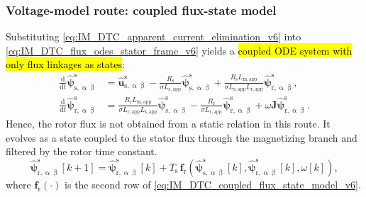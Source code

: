 \begin{frame}
    \frametitle{Voltage-model route: coupled flux-state model}
    Substituting \eqref{eq:IM_DTC_apparent_current_elimination_v6} into \eqref{eq:IM_DTC_flux_odes_stator_frame_v6} yields a \hl{coupled ODE system with only flux linkages as states}:
    \begin{equation}
        \begin{aligned}
            \frac{\mathrm{d}}{\mathrm{d}t}\hat{\bm{\psi}}^{\mathrm{s}}_{\mathrm{s},\upalpha\upbeta}
             & =\hat{\bm{u}}^{\mathrm{s}}_{\mathrm{s},\upalpha\upbeta}
            -\frac{R_\mathrm{s}}{\sigma L_{\mathrm{s,app}}}
            \hat{\bm{\psi}}^{\mathrm{s}}_{\mathrm{s},\upalpha\upbeta}
            +\frac{R_\mathrm{s}L_{\mathrm{m,app}}}{\sigma L_{\mathrm{s,app}}L_{\mathrm{r,app}}}
            \hat{\bm{\psi}}^{\mathrm{s}}_{\mathrm{r},\upalpha\upbeta},                             \\[0.6ex]
            \frac{\mathrm{d}}{\mathrm{d}t}\hat{\bm{\psi}}^{\mathrm{s}}_{\mathrm{r},\upalpha\upbeta}
             & =\frac{R_\mathrm{r}L_{\mathrm{m,app}}}{\sigma L_{\mathrm{r,app}}L_{\mathrm{s,app}}}
            \hat{\bm{\psi}}^{\mathrm{s}}_{\mathrm{s},\upalpha\upbeta}
            -\frac{R_\mathrm{r}}{\sigma L_{\mathrm{r,app}}}
            \hat{\bm{\psi}}^{\mathrm{s}}_{\mathrm{r},\upalpha\upbeta}
            +\omega\bm{J}\hat{\bm{\psi}}^{\mathrm{s}}_{\mathrm{r},\upalpha\upbeta}.
        \end{aligned}
        \label{eq:IM_DTC_coupled_flux_state_model_v6}
    \end{equation}\pause%
    Hence, the rotor flux is not obtained from a static relation in this route. It evolves as a state coupled to the stator flux through the magnetizing branch and filtered by the rotor time constant.\pause%
    \begin{equation}
        \hat{\bm{\psi}}^{\mathrm{s}}_{\mathrm{r},\upalpha\upbeta}[k+1]
        =\hat{\bm{\psi}}^{\mathrm{s}}_{\mathrm{r},\upalpha\upbeta}[k]
        +T_\mathrm{s}\,\bm{f}_\mathrm{r}\!\left(
        \hat{\bm{\psi}}^{\mathrm{s}}_{\mathrm{s},\upalpha\upbeta}[k],
        \hat{\bm{\psi}}^{\mathrm{s}}_{\mathrm{r},\upalpha\upbeta}[k],\omega[k]\right),
        \label{eq:IM_DTC_rotor_flux_euler_v6}
    \end{equation}
    where $\bm{f}_\mathrm{r}(\cdot)$ is the second row of \eqref{eq:IM_DTC_coupled_flux_state_model_v6}.
\end{frame}

